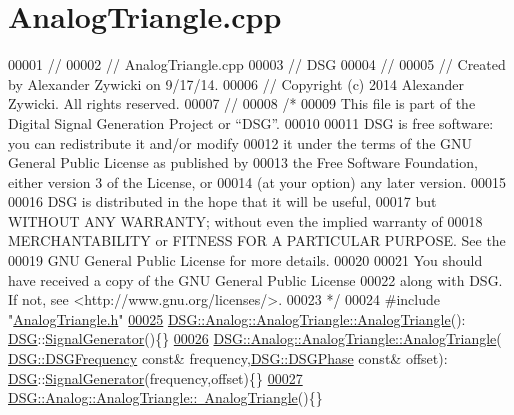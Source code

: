 \hypertarget{_analog_triangle_8cpp_source}{\section{Analog\+Triangle.\+cpp}
\label{_analog_triangle_8cpp_source}
}

\begin{DoxyCode}
00001 \textcolor{comment}{//}
00002 \textcolor{comment}{//  AnalogTriangle.cpp}
00003 \textcolor{comment}{//  DSG}
00004 \textcolor{comment}{//}
00005 \textcolor{comment}{//  Created by Alexander Zywicki on 9/17/14.}
00006 \textcolor{comment}{//  Copyright (c) 2014 Alexander Zywicki. All rights reserved.}
00007 \textcolor{comment}{//}
00008 \textcolor{comment}{/*}
00009 \textcolor{comment}{ This file is part of the Digital Signal Generation Project or “DSG”.}
00010 \textcolor{comment}{}
00011 \textcolor{comment}{ DSG is free software: you can redistribute it and/or modify}
00012 \textcolor{comment}{ it under the terms of the GNU General Public License as published by}
00013 \textcolor{comment}{ the Free Software Foundation, either version 3 of the License, or}
00014 \textcolor{comment}{ (at your option) any later version.}
00015 \textcolor{comment}{}
00016 \textcolor{comment}{ DSG is distributed in the hope that it will be useful,}
00017 \textcolor{comment}{ but WITHOUT ANY WARRANTY; without even the implied warranty of}
00018 \textcolor{comment}{ MERCHANTABILITY or FITNESS FOR A PARTICULAR PURPOSE.  See the}
00019 \textcolor{comment}{ GNU General Public License for more details.}
00020 \textcolor{comment}{}
00021 \textcolor{comment}{ You should have received a copy of the GNU General Public License}
00022 \textcolor{comment}{ along with DSG.  If not, see <http://www.gnu.org/licenses/>.}
00023 \textcolor{comment}{ */}
00024 \textcolor{preprocessor}{#include "\hyperlink{_analog_triangle_8h}{AnalogTriangle.h}"}
\hypertarget{_analog_triangle_8cpp_source_l00025}{}\hyperlink{class_d_s_g_1_1_analog_1_1_analog_triangle_a2fe1a7a29eb9472323a2a1c0d0696e55}{00025} \hyperlink{class_d_s_g_1_1_analog_1_1_analog_triangle_a2fe1a7a29eb9472323a2a1c0d0696e55}{DSG::Analog::AnalogTriangle::AnalogTriangle}():
      \hyperlink{namespace_d_s_g}{DSG}::\hyperlink{class_d_s_g_1_1_signal_generator}{SignalGenerator}()\{\}
\hypertarget{_analog_triangle_8cpp_source_l00026}{}\hyperlink{class_d_s_g_1_1_analog_1_1_analog_triangle_a75c0a8b20e1843b35de3944da11c75ed}{00026} \hyperlink{class_d_s_g_1_1_analog_1_1_analog_triangle_a2fe1a7a29eb9472323a2a1c0d0696e55}{DSG::Analog::AnalogTriangle::AnalogTriangle}(
      \hyperlink{namespace_d_s_g_a4315a061386fa1014fda09b15d3a6973}{DSG::DSGFrequency} \textcolor{keyword}{const}& frequency,\hyperlink{namespace_d_s_g_a44431ce1eb0a7300efdd207bc879e52c}{DSG::DSGPhase} \textcolor{keyword}{const}& offset):
      \hyperlink{namespace_d_s_g}{DSG}::\hyperlink{class_d_s_g_1_1_signal_generator}{SignalGenerator}(frequency,offset)\{\}
\hypertarget{_analog_triangle_8cpp_source_l00027}{}\hyperlink{class_d_s_g_1_1_analog_1_1_analog_triangle_af6e127d2fb623afad9b172e7c8b3c656}{00027} \hyperlink{class_d_s_g_1_1_analog_1_1_analog_triangle_af6e127d2fb623afad9b172e7c8b3c656}{DSG::Analog::AnalogTriangle::~AnalogTriangle}()\{\}
\end{DoxyCode}
